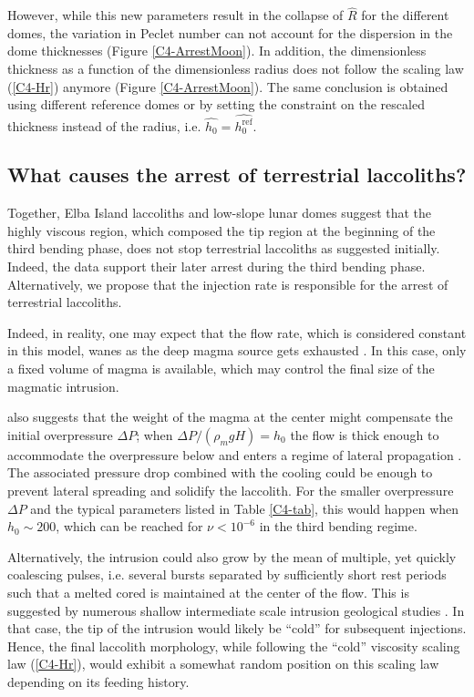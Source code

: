 However, while this new parameters result in the collapse of $\hat{R}$
for  the different  domes,  the  variation in  Peclet  number can  not
account   for  the   dispersion  in   the  dome   thicknesses  (Figure
\ref{C4-ArrestMoon}).  In  addition, the dimensionless thickness  as a
function of the  dimensionless radius does not follow  the scaling law
(\ref{C4-Hr})   anymore   (Figure  \ref{C4-ArrestMoon}).    The   same
conclusion is obtained  using different reference domes  or by setting
the constraint on  the rescaled thickness instead of  the radius, i.e.
$\hat{h_0}=\hat{h_0^{\text{ref}}}$.

\subsection{What causes the arrest of terrestrial laccoliths?}
\label{sec:large-mafic-sill}

Together,  Elba Island  laccoliths and  low-slope lunar  domes suggest
that the highly  viscous region, which composed the tip  region at the
beginning  of  the third  bending  phase,  does not  stop  terrestrial
laccoliths  as suggested  initially.  Indeed,  the data  support their
later arrest during the third bending phase. Alternatively, we propose
that the injection  rate is responsible for the  arrest of terrestrial
laccoliths.

Indeed,  in reality,  one  may expect  that the  flow  rate, which  is
considered constant in this model, wanes as the deep magma source gets
exhausted \citep{Taisne:2009va,Rivalta:2010em}.  In  this case, only a
fixed volume of  magma is available, which may control  the final size
of the magmatic intrusion.

\citet{Michaut:2011kg} also suggests  that the weight of  the magma at
the center might compensate the  initial overpressure $\Delta P$; when
$\Delta P/(\rho_m  g H)=h_0$ the  flow is thick enough  to accommodate
the  overpressure below  and enters  a regime  of lateral  propagation
\citep{Michaut:2011kg}. The associated pressure drop combined with the
cooling could be enough to  prevent lateral spreading and solidify the
laccolith.  For  the smaller overpressure  $\Delta P$ and  the typical
parameters  listed  in  Table  \ref{C4-tab}, this  would  happen  when
$h_0\sim 200$,  which can  be reached for  $\nu<10^{-6}$ in  the third
bending regime.

Alternatively, the intrusion could also grow by the mean of multiple,
yet  quickly  coalescing  pulses,  i.e. several  bursts  separated  by
sufficiently short rest periods such that a melted cored is maintained
at the  center of  the flow.   This is  suggested by  numerous shallow
intermediate       scale       intrusion      geological       studies
\citep{Habert:2004wg,Horsman:2005ct,Morgan:2008hj,Leuthold:2012gja,Roni:2014gt}.
In that  case, the tip of  the intrusion would likely  be ``cold'' for
subsequent injections.   Hence, the final laccolith  morphology, while
following  the ``cold''  viscosity  scaling  law (\ref{C4-Hr}),  would
exhibit a  somewhat random position  on this scaling law  depending on
its feeding history.


